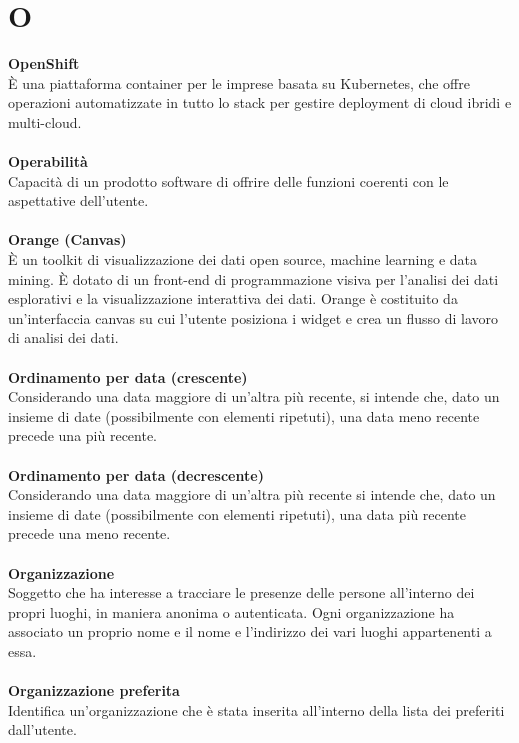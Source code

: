 \section{O}
\textbf{OpenShift}\\
È una piattaforma container per le imprese basata su Kubernetes, che offre operazioni automatizzate in tutto lo stack per gestire deployment di cloud ibridi e multi-cloud. \\ \\
\textbf{Operabilità}\\
Capacità di un prodotto software di offrire delle funzioni coerenti con le aspettative dell’utente. \\ \\
\textbf{Orange (Canvas)}\\
È un toolkit di visualizzazione dei dati open source, machine learning e data mining. È dotato di un front-end di programmazione visiva per l'analisi dei dati esplorativi e la visualizzazione interattiva dei dati. Orange è costituito da un'interfaccia canvas su cui l'utente posiziona i widget e crea un flusso di lavoro di analisi dei dati. \\ \\
\textbf{Ordinamento per data (crescente)}\\
Considerando una data maggiore di un'altra più recente, si intende che, dato un insieme di date (possibilmente con elementi ripetuti), una data meno recente precede una più recente. \\ \\
\textbf{Ordinamento per data (decrescente)}\\
Considerando una data maggiore di un'altra più recente si intende che, dato un insieme di date (possibilmente con elementi ripetuti), una data più recente precede una meno recente. \\ \\
\textbf{Organizzazione}\\
Soggetto che ha interesse a tracciare le presenze delle persone all’interno dei propri luoghi, in maniera anonima o autenticata. Ogni organizzazione ha associato un proprio nome e il nome e l'indirizzo dei vari luoghi appartenenti a essa. \\ \\
\textbf{Organizzazione preferita}\\
Identifica un'organizzazione che è stata inserita all'interno della lista dei preferiti dall'utente. \\ \\
\clearpage
